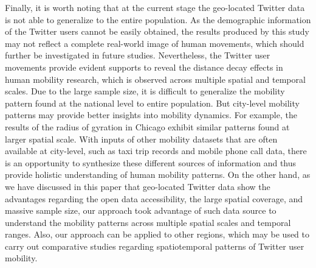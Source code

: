 \documentclass[ijgi,article,accept,moreauthors,pdftex,10pt,a4paper]{mdpi}
\theoremstyle{mdpi}
\newcounter{ex}
\newcounter{re}
\theoremstyle{mdpidefinition}
\begin{document}
Finally, it is worth noting that at the current stage the geo-located Twitter data is not able to generalize to the entire population.
As the demographic information of the Twitter users cannot be easily obtained, the results produced by this study may not reflect a complete real-world image of human movements, which should further be investigated in future studies.
Nevertheless, the Twitter user movements provide evident supports to reveal the distance decay effects in human mobility research, which is observed across multiple spatial and temporal scales.
Due to the large sample size, it is difficult to generalize the mobility pattern found at the national level to entire population.
But city-level mobility patterns may provide better insights into mobility dynamics. For example, the results of the radius of gyration in Chicago exhibit similar patterns found at larger spatial scale.
With inputs of other mobility datasets that are often available at city-level, such as taxi trip records and mobile phone call data, there is an opportunity to synthesize these different sources of information and thus provide holistic understanding of human mobility patterns.
On the other hand, as we have discussed in this paper that geo-located Twitter data show the advantages regarding the open data accessibility, the large spatial coverage, and massive sample size, our approach took advantage of such data source to understand the mobility patterns across multiple spatial scales and temporal ranges.
Also, our approach can be applied to other regions, which may be used to carry out comparative studies regarding spatiotemporal patterns of Twitter user mobility. 




\end{document}
